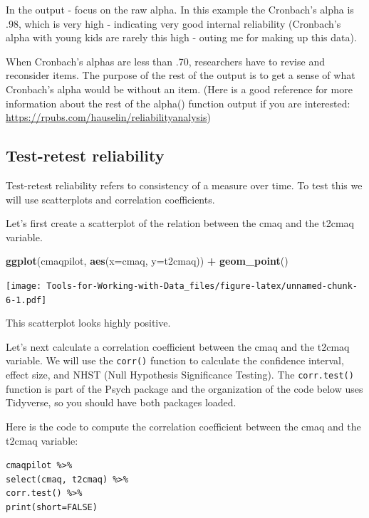 \documentclass[
]{book}
\newenvironment{Shaded}{\begin{snugshade}}{\end{snugshade}}
\newcommand{\DataTypeTok}[1]{\textcolor[rgb]{0.13,0.29,0.53}{#1}}
\newcommand{\KeywordTok}[1]{\textcolor[rgb]{0.13,0.29,0.53}{\textbf{#1}}}
\newcommand{\NormalTok}[1]{#1}
\newcommand{\OperatorTok}[1]{\textcolor[rgb]{0.81,0.36,0.00}{\textbf{#1}}}
\newcommand{\StringTok}[1]{\textcolor[rgb]{0.31,0.60,0.02}{#1}}
\begin{document}
In the output - focus on the raw alpha. In this example the Cronbach's alpha is .98, which is very high - indicating very good internal reliability (Cronbach's alpha with young kids are rarely this high - outing me for making up this data).

When Cronbach's alphas are less than .70, researchers have to revise and reconsider items. The purpose of the rest of the output is to get a sense of what Cronbach's alpha would be without an item. (Here is a good reference for more information about the rest of the alpha() function output if you are interested: \url{https://rpubs.com/hauselin/reliabilityanalysis})

\hypertarget{test-retest-reliability}{%
\subsection{Test-retest reliability}\label{test-retest-reliability}}

Test-retest reliability refers to consistency of a measure over time. To test this we will use scatterplots and correlation coefficients.

Let's first create a scatterplot of the relation between the cmaq and the t2cmaq variable.

\begin{Shaded}
\begin{Highlighting}[]
\KeywordTok{ggplot}\NormalTok{(cmaqpilot, }\KeywordTok{aes}\NormalTok{(}\DataTypeTok{x=}\NormalTok{cmaq, }\DataTypeTok{y=}\NormalTok{t2cmaq)) }\OperatorTok{+}
\StringTok{  }\KeywordTok{geom_point}\NormalTok{()}
\end{Highlighting}
\end{Shaded}

\texttt{[image: Tools-for-Working-with-Data\_files/figure-latex/unnamed-chunk-6-1.pdf]}

This scatterplot looks highly positive.

Let's next calculate a correlation coefficient between the cmaq and the t2cmaq variable. We will use the \texttt{corr()} function to calculate the confidence interval, effect size, and NHST (Null Hypothesis Significance Testing). The \texttt{corr.test()} function is part of the Psych package and the organization of the code below uses Tidyverse, so you should have both packages loaded.

Here is the code to compute the correlation coefficient between the cmaq and the t2cmaq variable:

\texttt{cmaqpilot\ \%\textgreater{}\%}\\
\texttt{select(cmaq,\ t2cmaq)\ \%\textgreater{}\%}~\\
\texttt{corr.test()\ \%\textgreater{}\%}~\\
\texttt{print(short=FALSE)}
\end{document}
